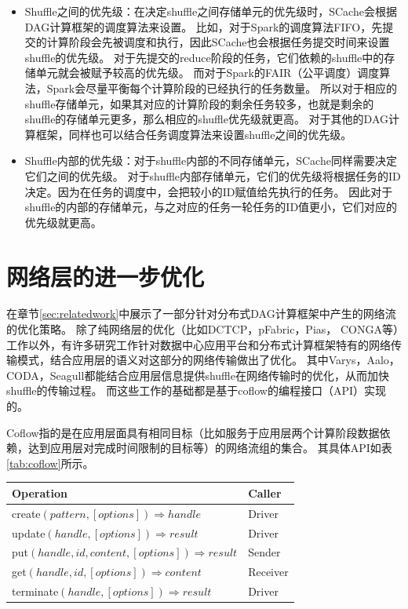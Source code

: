 \begin{itemize}
	\item Shuffle之间的优先级：在决定shuffle之间存储单元的优先级时，SCache会根据DAG计算框架的调度算法来设置。
比如，对于Spark的调度算法FIFO，先提交的计算阶段会先被调度和执行，因此SCache也会根据任务提交时间来设置shuffle的优先级。
	对于先提交的reduce阶段的任务，它们依赖的shuffle中的存储单元就会被赋予较高的优先级。
	而对于Spark的FAIR（公平调度）调度算法，Spark会尽量平衡每个计算阶段的已经执行的任务数量。
	所以对于相应的shuffle存储单元，如果其对应的计算阶段的剩余任务较多，也就是剩余的shuffle的存储单元更多，那么相应的shuffle优先级就更高。
	对于其他的DAG计算框架，同样也可以结合任务调度算法来设置shuffle之间的优先级。
	\item Shuffle内部的优先级：对于shuffle内部的不同存储单元，SCache同样需要决定它们之间的优先级。
	对于shuffle内部存储单元，它们的优先级将根据任务的ID决定。因为在任务的调度中，会把较小的ID赋值给先执行的任务。
	因此对于shuffle的内部的存储单元，与之对应的任务一轮任务的ID值更小，它们对应的优先级就更高。
\end{itemize}

\section{网络层的进一步优化}
\label{sec:network}

在章节\ref{sec:relatedwork}中展示了一部分针对分布式DAG计算框架中产生的网络流的优化策略。
除了纯网络层的优化（比如DCTCP\cite{dctcp}，pFabric\cite{pfabric}，Pias\cite{pias}， CONGA\cite{conga}等）工作以外，有许多研究工作针对数据中心应用平台和分布式计算框架特有的网络传输模式，结合应用层的语义对这部分的网络传输做出了优化。
其中Varys\cite{varys}，Aalo\cite{aalo}，CODA\cite{coda}，Seagull\cite{seagull}都能结合应用层信息提供shuffle在网络传输时的优化，从而加快shuffle的传输过程。
而这些工作的基础都是基于coflow\cite{coflow}的编程接口（API）实现的。

Coflow指的是在应用层面具有相同目标（比如服务于应用层两个计算阶段数据依赖，达到应用层对完成时间限制的目标等）的网络流组的集合。
其具体API\cite{coflow}如表\ref{tab:coflow}所示。

\begin{table}[!hpb]
    \centering
    \begin{tabular}{ | m{10cm} | m{5cm} | }
        \hline
        Operation & Caller \\ [0.5ex]
        \hline
        \hline
        create$(pattern, [options]) \Rightarrow handle$ & Driver\\ \hline
        update$(handle, [options]) \Rightarrow result$ & Driver \\ \hline
        put$(handle, id, content, [options]) \Rightarrow result$ & Sender \\ \hline
        get$(handle, id, [options]) \Rightarrow content$ & Receiver \\ \hline
        terminate$(handle, [options]) \Rightarrow result$ & Driver \\ 
        \hline
    \end{tabular}
\end{table}


